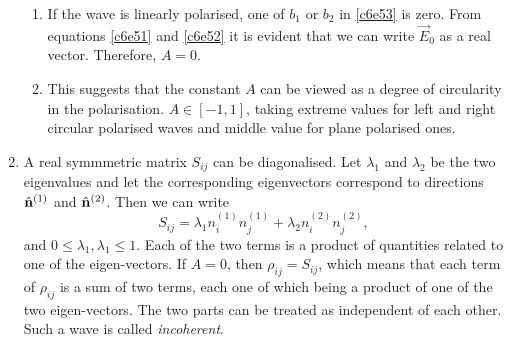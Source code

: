 \begin{enumerate}
\begin{enumerate}
\item If the wave is linearly polarised, one of $b_1$ or $b_2$ in \eqref{c6e53}
is zero. From equations \eqref{c6e51} and \eqref{c6e52} it is evident that we can
write $\vec{E}_0$ as a real vector. Therefore, $A = 0$.

\item This suggests that the constant $A$ can be viewed as a degree of circularity
in the polarisation. $A \in [-1, 1]$, taking extreme values for left and right 
circular polarised waves and middle value for plane polarised ones.
\end{enumerate}

\item A real symmmetric matrix $S_{ij}$ can be diagonalised. Let $\lambda_1$ and
$\lambda_2$ be the two eigenvalues and let the corresponding eigenvectors 
correspond to directions $\hat{\mathbf{n}}^{(1)}$ and $\hat{\mathbf{n}}^{(2)}$. Then we can write
\begin{equation}\label{c6e99}
S_{ij} = \lambda_1 n^{(1)}_in^{(1)}_j + \lambda_2 n^{(2)}_in^{(2)}_j,
\end{equation}
and $0 \le \lambda_1, \lambda_1 \le 1$. Each of the two terms is a product of
quantities related to one of the eigen-vectors. If $A = 0$, then $\rho_{ij} = 
S_{ij}$, which means that each term of $\rho_{ij}$ is a sum of two terms, each
one of which being a product of one of the two eigen-vectors. The two parts can
be treated as independent of each other. Such a wave is called \emph{incoherent}.


\end{enumerate}

